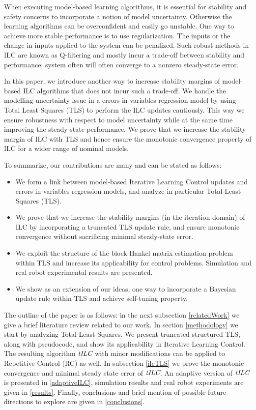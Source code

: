 \documentclass[10pt,a4paper]{article}
\newcommand{\alg}{\emph{tILC}}
\begin{document}
When executing model-based learning algorithms, it is essential for stability and safety concerns to incorporate a notion of model uncertainty. Otherwise the learning algorithms can be overconfident and easily go unstable. One way to achieve more stable performance is to use regularization. The inputs or the change in inputs applied to the system can be penalized. Such robust methods in ILC are known as Q-filtering and mostly incur a trade-off between stability and performance: system often will often converge to a nonzero steady-state error. 

In this paper, we introduce another way to increase stability margins of model-based ILC algorithms that does not incur such a trade-off. We handle the modelling uncertainty issue in a errors-in-variables regression model by using Total Least Squares (TLS) to perform the ILC updates cautiously. This way we ensure robustness with respect to model uncertainty while at the same time improving the steady-state performance. We prove that we increase the stability margin of ILC with TLS and hence ensure the monotonic convergence property of ILC for a wider range of nominal models.

To summarize, our contributions are many and can be stated as follows:

\begin{itemize}
\item We form a link between model-based Iterative Learning Control updates and errors-in-variables regression models, and analyze in particular Total Least Squares (TLS).
\item We prove that we increase the stability margins (in the iteration domain) of ILC by incorporating a truncated TLS update rule, and ensure monotonic convergence without sacrificing minimal steady-state error. 
\item We exploit the structure of the block Hankel matrix estimation problem within TLS and increase its applicability for control problems. Simulation and real robot experimental results are presented.
\item We show as an extension of our ideas, one way to incorporate a Bayesian update rule within TLS and achieve self-tuning property. 
\end{itemize}

The outline of the paper is as follows: in the next subsection \ref{relatedWork} we give a brief literature review related to our work. In section \ref{methodology} we start by analyzing Total Least Squares. We present truncated structured TLS, along with pseudocode, and show its applicability in Iterative Learning Control. The resulting algorithm $\alg$ with minor modifications can be applied to Repetitive Control (RC) as well. In subsection \ref{ilcTLS} we prove the monotonic convergence and minimal steady state error of $\alg$. An adaptive version of $\alg$ is presented in \ref{adaptiveILC}, simulation results and real robot experiments are given in \ref{results}. Finally, conclusions and brief mention of possible future directions to explore are given in \ref{conclusions}.
\end{document}
